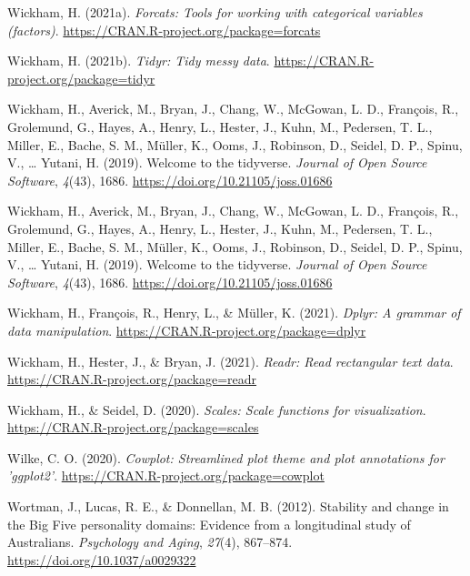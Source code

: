 \documentclass[
  english,
  man,floatsintext]{apa7}
\begin{document}
\leavevmode\hypertarget{ref-R-forcats}{}%
Wickham, H. (2021a). \emph{Forcats: Tools for working with categorical variables (factors)}. \url{https://CRAN.R-project.org/package=forcats}

\leavevmode\hypertarget{ref-R-tidyr}{}%
Wickham, H. (2021b). \emph{Tidyr: Tidy messy data}. \url{https://CRAN.R-project.org/package=tidyr}

\leavevmode\hypertarget{ref-tidyverse2019}{}%
Wickham, H., Averick, M., Bryan, J., Chang, W., McGowan, L. D., François, R., Grolemund, G., Hayes, A., Henry, L., Hester, J., Kuhn, M., Pedersen, T. L., Miller, E., Bache, S. M., Müller, K., Ooms, J., Robinson, D., Seidel, D. P., Spinu, V., \ldots{} Yutani, H. (2019). Welcome to the tidyverse. \emph{Journal of Open Source Software}, \emph{4}(43), 1686. \url{https://doi.org/10.21105/joss.01686}

\leavevmode\hypertarget{ref-R-tidyverse}{}%
Wickham, H., Averick, M., Bryan, J., Chang, W., McGowan, L. D., François, R., Grolemund, G., Hayes, A., Henry, L., Hester, J., Kuhn, M., Pedersen, T. L., Miller, E., Bache, S. M., Müller, K., Ooms, J., Robinson, D., Seidel, D. P., Spinu, V., \ldots{} Yutani, H. (2019). Welcome to the tidyverse. \emph{Journal of Open Source Software}, \emph{4}(43), 1686. \url{https://doi.org/10.21105/joss.01686}

\leavevmode\hypertarget{ref-R-dplyr}{}%
Wickham, H., François, R., Henry, L., \& Müller, K. (2021). \emph{Dplyr: A grammar of data manipulation}. \url{https://CRAN.R-project.org/package=dplyr}

\leavevmode\hypertarget{ref-R-readr}{}%
Wickham, H., Hester, J., \& Bryan, J. (2021). \emph{Readr: Read rectangular text data}. \url{https://CRAN.R-project.org/package=readr}

\leavevmode\hypertarget{ref-R-scales}{}%
Wickham, H., \& Seidel, D. (2020). \emph{Scales: Scale functions for visualization}. \url{https://CRAN.R-project.org/package=scales}

\leavevmode\hypertarget{ref-R-cowplot}{}%
Wilke, C. O. (2020). \emph{Cowplot: Streamlined plot theme and plot annotations for 'ggplot2'}. \url{https://CRAN.R-project.org/package=cowplot}

\leavevmode\hypertarget{ref-wortmanStabilityChangeBig2012}{}%
Wortman, J., Lucas, R. E., \& Donnellan, M. B. (2012). Stability and change in the Big Five personality domains: Evidence from a longitudinal study of Australians. \emph{Psychology and Aging}, \emph{27}(4), 867--874. \url{https://doi.org/10.1037/a0029322}
\end{document}
